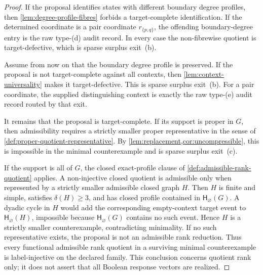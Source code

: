 \documentclass[11pt]{article}
\newcommand{\profile}{\mathsf H}
\begin{document}
\begin{proof}
If the proposal identifies states with different boundary degree profiles,
then \cref{lem:degree-profile-fibres} forbids a target-complete identification.
If the determined coordinate is a pair coordinate \(r_{\{p,q\}}\), the
offending boundary-degree entry is the raw type-(d) audit record.  In every
case the non-fibrewise quotient is target-defective, which is sparse surplus
exit~(b).

Assume from now on that the boundary degree profile is preserved.  If the
proposal is not target-complete against all contexts, then
\cref{lem:context-universality} makes it target-defective.  This is sparse
surplus exit~(b).  For a pair coordinate, the supplied distinguishing context
is exactly the raw type-(e) audit record routed by that exit.

It remains that the proposal is target-complete.  If its support is proper in
\(G\), then admissibility requires a strictly smaller proper representative in
the sense of \cref{def:proper-quotient-representative}.  By
\cref{lem:replacement,cor:uncompressible}, this is impossible in the minimal
counterexample and is sparse surplus exit~(c).

If the support is all of \(G\), the closed exact-profile clause of
\cref{def:admissible-rank-quotient} applies.  A non-injective closed quotient
is admissible only when represented by a strictly smaller admissible closed
graph \(H\).  Then \(H\) is finite and simple, satisfies \(\delta(H)\ge3\),
and has closed profile contained in \(\profile_\varnothing(G)\).  A dyadic
cycle in \(H\) would add the corresponding empty-context target event to
\(\profile_\varnothing(H)\), impossible because
\(\profile_\varnothing(G)\) contains no such event.  Hence \(H\) is a strictly
smaller counterexample, contradicting minimality.  If no such representative
exists, the proposal is not an admissible rank reduction.  Thus every
functional admissible rank quotient in a surviving minimal counterexample is
label-injective on the declared family.  This conclusion concerns quotient
rank only; it does not assert that all Boolean response vectors are realized.
\end{proof}
\end{document}
